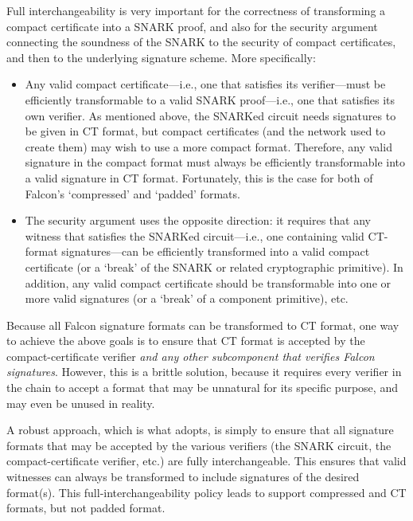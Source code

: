 \documentclass[11pt]{article}
\begin{document}
Full interchangeability is very important for the correctness of
transforming a compact certificate into a SNARK proof, and also for
the security argument connecting the soundness of the SNARK to the
security of compact certificates, and then to the underlying signature
scheme. More specifically:
\begin{itemize}
\item Any valid compact certificate---i.e., one that satisfies its
  verifier---must be efficiently transformable to a valid SNARK
  proof---i.e., one that satisfies its own verifier. As mentioned
  above, the SNARKed circuit needs signatures to be given in CT
  format, but compact certificates (and the network used to create
  them) may wish to use a more compact format. Therefore, any valid
  signature in the compact format must always be efficiently
  transformable into a valid signature in CT format. Fortunately, this
  is the case for both of Falcon's `compressed' and `padded' formats.
  
\item The security argument uses the opposite direction: it requires
  that any witness that satisfies the SNARKed circuit---i.e., one
  containing valid CT-format signatures---can be efficiently
  transformed into a valid compact certificate (or a `break' of the
  SNARK or related cryptographic primitive). In addition, any valid
  compact certificate should be transformable into one or more valid
  signatures (or a `break' of a component primitive), etc.
\end{itemize}

Because all Falcon signature formats can be transformed to CT format,
one way to achieve the above goals is to ensure that CT format is
accepted by the compact-certificate verifier \emph{and any other
  subcomponent that verifies Falcon signatures}. However, this is a
brittle solution, because it requires every verifier in the chain to
accept a format that may be unnatural for its specific purpose, and
may even be unused in reality.

A robust approach, which is what \fd adopts, is simply to ensure that
all signature formats that may be accepted by the various verifiers
(the SNARK circuit, the compact-certificate verifier, etc.) are fully
interchangeable. This ensures that valid witnesses can always be
transformed to include signatures of the desired format(s). This
full-interchangeability policy leads \fd to support compressed and CT
formats, but not padded format.

\end{document}
